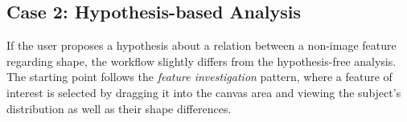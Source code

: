 \documentclass[journal]{style/vgtc} 			          %
\newcommand{\com}[1]{\textcolor{orange}{\uline{#1}}}
\begin{document}
\subsection{Case 2: Hypothesis-based Analysis}
If the user proposes a hypothesis about a relation between a non-image feature regarding shape, the workflow slightly differs from the hypothesis-free analysis.
%
The starting point follows the \emph{feature investigation} pattern, where a feature of interest is selected by dragging it into the canvas area and viewing the subject's distribution as well as their shape differences.
% 
\end{document}
